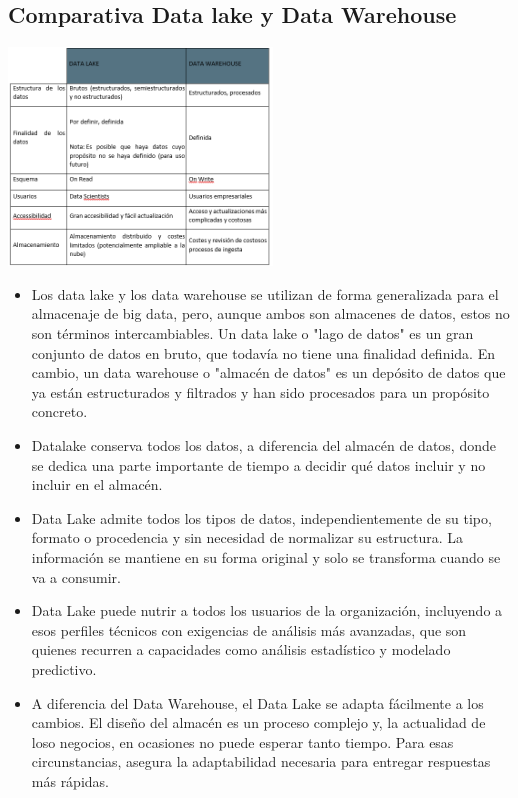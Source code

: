 \documentclass[twoside,twocolumn]{article}
\begin{document}
\subsection{Comparativa Data lake y Data Warehouse}
\includegraphics[width=7cm]{imagenes/imagen5.png}
\begin{itemize}
    \item  Los data lake y los data warehouse se utilizan de forma generalizada para el almacenaje de big data, pero, aunque ambos son almacenes de datos, estos no son términos intercambiables. Un data lake o "lago de datos" es un gran conjunto de datos en bruto, que todavía no tiene una finalidad definida. En cambio, un data warehouse o "almacén de datos" es un depósito de datos que ya están estructurados y filtrados y han sido procesados para un propósito concreto.
    \item   Datalake conserva todos los datos, a diferencia del almacén de datos, donde se dedica una parte importante de tiempo a decidir qué datos incluir y no incluir en el almacén.
    \item Data Lake admite todos los tipos de datos, independientemente de su tipo, formato o procedencia y sin necesidad de normalizar su estructura. La información se mantiene en su forma original y solo se transforma cuando se va a consumir.
    \item   Data Lake puede nutrir a todos los usuarios de la organización, incluyendo a esos perfiles técnicos con exigencias de análisis más avanzadas, que son quienes recurren a capacidades como análisis estadístico y modelado predictivo.
    \item   A diferencia del Data Warehouse, el Data Lake se adapta fácilmente a los cambios. El diseño del almacén es un proceso complejo y, la actualidad de loso negocios, en ocasiones no puede esperar tanto tiempo. Para esas circunstancias, asegura la adaptabilidad necesaria para entregar respuestas más rápidas.
\end{itemize}
\end{document}
